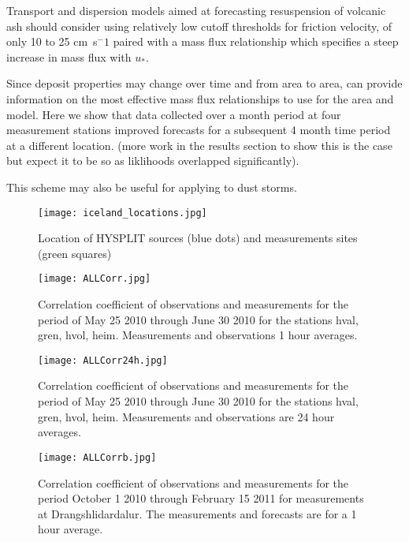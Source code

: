 Transport and dispersion models aimed at forecasting resuspension of volcanic ash should consider using
relatively low cutoff thresholds for friction velocity, of only 10 to 25 cm~s$^-1$ paired with a mass flux
relationship which specifies a steep increase in mass flux with $u_*$. 

Since deposit properties may change over time and from area to area, 
can provide information on the most effective mass flux relationships to use for the area and model. 
Here we show that data collected over a month period at four measurement stations improved forecasts for a subsequent 4 month time period
at a different location.
(more work in the results section to show this is the case but expect it to be so as liklihoods overlapped significantly).

This scheme may also be useful for applying to dust storms.




{}




\begin{figure}[t]
\texttt{[image: iceland\_locations.jpg]}
\caption{Location of HYSPLIT sources (blue dots) and measurements sites (green squares)}
\label{fig:sources}
\end{figure}
%

\begin{figure}[t]
\texttt{[image: ALLCorr.jpg]}
\caption{Correlation coefficient of observations and measurements for the period of May 25 2010 through June 30 2010
for the stations hval, gren, hvol, heim.
Measurements and observations 1 hour averages.}
\label{fig:correlationsa}
\end{figure}

\begin{figure}[t]
\texttt{[image: ALLCorr24h.jpg]}
\caption{Correlation coefficient of observations and measurements for the period of May 25 2010 through June 30 2010
for the stations hval, gren, hvol, heim.
Measurements and observations are 24 hour averages.}
\label{fig:correlationsb}
\end{figure}

\begin{figure}[t]
\texttt{[image: ALLCorrb.jpg]}
\caption{Correlation coefficient of observations and measurements for the period October 1 2010 through February 15 2011
for measurements at  Drangshlidardalur. The measurements and forecasts are for a 1 hour average.}
\label{fig:correlationsc}
\end{figure}


